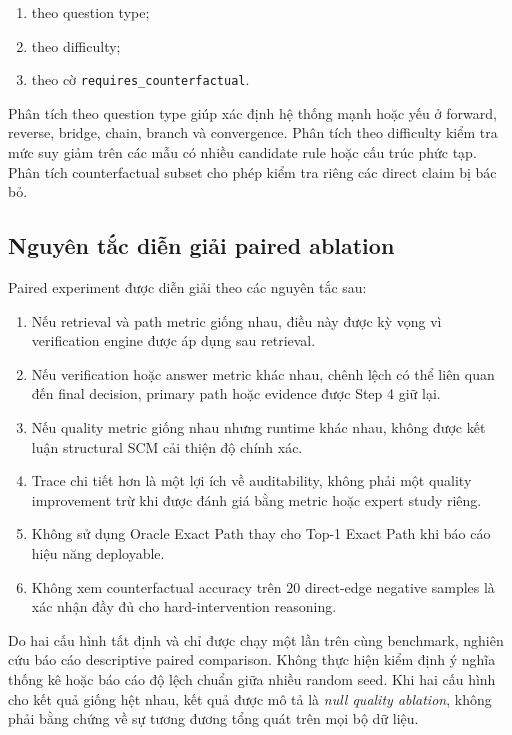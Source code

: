 \begin{enumerate}
    \item theo question type;
    \item theo difficulty;
    \item theo cờ \texttt{requires\_counterfactual}.
\end{enumerate}

Phân tích theo question type giúp xác định hệ thống mạnh hoặc yếu ở forward,
reverse, bridge, chain, branch và convergence. Phân tích theo difficulty
kiểm tra mức suy giảm trên các mẫu có nhiều candidate rule hoặc cấu trúc
phức tạp. Phân tích counterfactual subset cho phép kiểm tra riêng các direct
claim bị bác bỏ.

\subsection{Nguyên tắc diễn giải paired ablation}

Paired experiment được diễn giải theo các nguyên tắc sau:

\begin{enumerate}
    \item Nếu retrieval và path metric giống nhau, điều này được kỳ vọng vì
    verification engine được áp dụng sau retrieval.

    \item Nếu verification hoặc answer metric khác nhau, chênh lệch có thể
    liên quan đến final decision, primary path hoặc evidence được Step 4 giữ
    lại.

    \item Nếu quality metric giống nhau nhưng runtime khác nhau, không được
    kết luận structural SCM cải thiện độ chính xác.

    \item Trace chi tiết hơn là một lợi ích về auditability, không phải một
    quality improvement trừ khi được đánh giá bằng metric hoặc expert study
    riêng.

    \item Không sử dụng Oracle Exact Path thay cho Top-1 Exact Path khi báo
    cáo hiệu năng deployable.

    \item Không xem counterfactual accuracy trên \(20\) direct-edge negative
    samples là xác nhận đầy đủ cho hard-intervention reasoning.
\end{enumerate}

Do hai cấu hình tất định và chỉ được chạy một lần trên cùng benchmark, nghiên
cứu báo cáo descriptive paired comparison. Không thực hiện kiểm định ý nghĩa
thống kê hoặc báo cáo độ lệch chuẩn giữa nhiều random seed. Khi hai cấu hình
cho kết quả giống hệt nhau, kết quả được mô tả là \emph{null quality
ablation}, không phải bằng chứng về sự tương đương tổng quát trên mọi bộ dữ
liệu.
